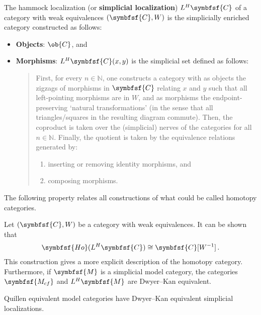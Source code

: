     \begin{construct}
        The hammock localization (or \textbf{simplicial localization}) $L^H\symbfsf{C}$ of a category with weak equivalences $(\symbfsf{C},W)$ is the simplicially enriched category constructed as follows:
        \begin{itemize}
            \item\textbf{Objects}: $\ob{C}$, and
            \item\textbf{Morphisms}: $L^H\symbfsf{C}(x,y)$ is the simplicial set defined as follows:
            \begin{quote}
                First, for every $n\in\mathbb{N}$, one constructs a category with as objects the zigzags of morphisms in $\symbfsf{C}$ relating $x$ and $y$ such that all left-pointing morphisms are in $W$, and as morphisms the endpoint-preserving `natural transformations' (in the sense that all triangles/squares in the resulting diagram commute). Then, the coproduct is taken over the (simplicial) nerves of the categories for all $n\in\mathbb{N}$. Finally, the quotient is taken by the equivalence relations generated by:
                \begin{enumerate}
                    \item inserting or removing identity morphisms, and
                    \item composing morphisms.
                \end{enumerate}
            \end{quote}
        \end{itemize}
    \end{construct}

    The following property relates all constructions of what could be called homotopy categories.
    \begin{property}
        Let $(\symbfsf{C},W)$ be a category with weak equivalences. It can be shown that
        \begin{gather}
            \symbfsf{Ho}(L^H\symbfsf{C})\cong\symbfsf{C}[W^{-1}]\,.
        \end{gather}
        This construction gives a more explicit description of the homotopy category. Furthermore, if $\symbfsf{M}$ is a simplicial model category, the categories $\symbfsf{M_{cf}}$ and $L^H\symbfsf{M}$ are Dwyer--Kan equivalent.
    \end{property}
    \begin{property}
        Quillen equivalent model categories have Dwyer--Kan equivalent simplicial localizations.
    \end{property}

